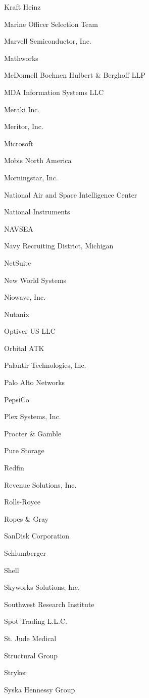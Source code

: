 \documentclass[twoside]{article}
\begin{document}
\begin{center}
\begin{multicols}{5}
\begin{FlushLeft}
\begin{compactitem}
\item Kraft Heinz
\item Marine Officer Selection Team
\item Marvell Semiconductor, Inc.
\item Mathworks
\item McDonnell Boehnen Hulbert \& Berghoff LLP
\item MDA Information Systems LLC
\item Meraki Inc.
\item Meritor, Inc.
\item Microsoft
\item Mobis North America
\item Morningstar, Inc.
\item National Air and Space Intelligence Center
\item National Instruments
\item NAVSEA
\item Navy Recruiting District, Michigan
\item NetSuite
\item New World Systems
\item Niowave, Inc.
\item Nutanix
\item Optiver US LLC
\item Orbital ATK
\item Palantir Technologies, Inc.
\item Palo Alto Networks
\item PepsiCo
\item Plex Systems, Inc.
\item Procter \& Gamble
\item Pure Storage
\item Redfin
\item Revenue Solutions, Inc.
\item Rolls-Royce
\item Ropes \& Gray
\item SanDisk Corporation
\item Schlumberger
\item Shell
\item Skyworks Solutions, Inc.
\item Southwest Research Institute
\item Spot Trading L.L.C.
\item St. Jude Medical
\item Structural Group
\item Stryker
\item Syska Hennessy Group

\end{compactitem}
\end{FlushLeft}
\end{multicols}
\end{center}
\end{document}
